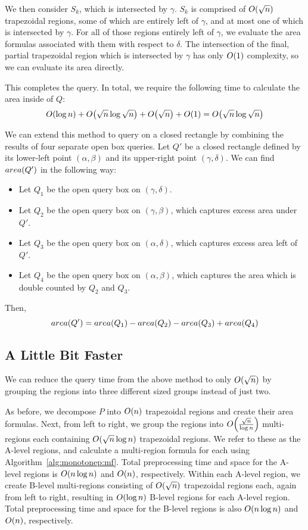 We then consider $S_k$, which is intersected by $\gamma$.  
$S_k$ is comprised of $O\!\left(\sqrt{n}\right)$ trapezoidal regions, some of which are entirely left of $\gamma$, and at most one of which is intersected by $\gamma$. 
For all of those regions entirely left of $\gamma$, we evaluate the area formulas associated with them with respect to $\delta$. 
The intersection of the final, partial trapezoidal region which is intersected by $\gamma$ has only $O\!\left(1\right)$ complexity, so we can evaluate its area directly.

This completes the query. In total, we require the following time to calculate the area inside of $Q$:
\[ 
O\!\left(\log{n}\right) + O\!\left(\sqrt{n}\log{\sqrt{n}}\right) + O\!\left(\sqrt{n}\right) + O\!\left(1\right) = O\!\left(\sqrt{n}\log{\sqrt{n}}\right)
\]

We can extend this method to query on a closed rectangle by combining the results of four separate open box queries.
Let $Q'$ be a closed rectangle defined by its lower-left point $(\alpha, \beta)$ and its upper-right point $(\gamma, \delta)$.
We can find $area(Q')$ in the following way:

\begin{itemize}
\item Let $Q_1$ be the open query box on $(\gamma, \delta)$.
\item Let $Q_2$ be the open query box on $(\gamma, \beta)$, which captures excess area under $Q'$.
\item Let $Q_3$ be the open query box on $(\alpha, \delta)$, which captures excess area left of $Q'$.
\item Let $Q_4$ be the open query box on $(\alpha, \beta)$, which captures the area which is double counted by $Q_2$ and $Q_3$.
\end{itemize}

\noindent Then,
\[
area(Q') = area(Q_1) - area(Q_2) - area(Q_3) + area(Q_4)
\]

\subsection{A Little Bit Faster}
\label{:mono2:bitfaster}

We can reduce the query time from the above method to only $O\!\left(\sqrt{n}\right)$ by grouping the regions into three different sized groups instead of just two.

As before, we decompose $P$ into $O\!\left(n\right)$ trapezoidal regions and create their area formulas.
Next, from left to right, we group the regions into $O\!\left(\frac{\sqrt{n}}{\log{n}}\right)$ multi-regions each containing $O\!\left(\sqrt{n}\log{n}\right)$ trapezoidal regions.
We refer to these as the A-level regions, and calculate a multi-region formula for each using Algorithm~\ref{alg:monotonep:mf}.
Total preprocessing time and space for the A-level regions is $O\!\left(n\log{n}\right)$ and $O\!\left(n\right)$, respectively.
Within each A-level region, we create B-level multi-regions consisting of $O\!\left(\sqrt{n}\right)$ trapezoidal regions each, again from left to right, resulting in $O\!\left(\log{n}\right)$ B-level regions for each A-level region.
Total preprocessing time and space for the B-level regions is also $O\!\left(n\log{n}\right)$ and $O\!\left(n\right)$, respectively.

